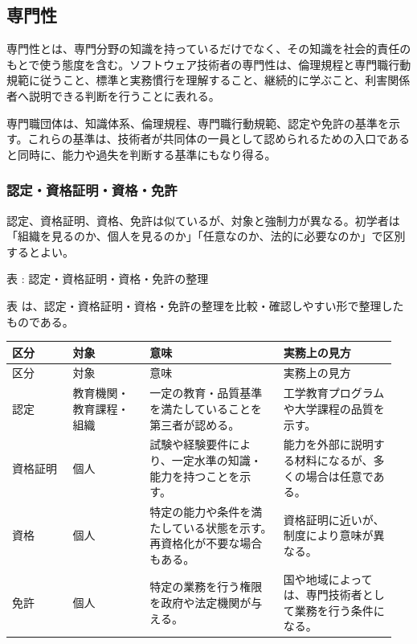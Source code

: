 \subsection*{専門性}


専門性とは、専門分野の知識を持っているだけでなく、その知識を社会的責任のもとで使う態度を含む。ソフトウェア技術者の専門性は、倫理規程と専門職行動規範に従うこと、標準と実務慣行を理解すること、継続的に学ぶこと、利害関係者へ説明できる判断を行うことに表れる。

専門職団体は、知識体系、倫理規程、専門職行動規範、認定や免許の基準を示す。これらの基準は、技術者が共同体の一員として認められるための入口であると同時に、能力や過失を判断する基準にもなり得る。

\subsubsection*{認定・資格証明・資格・免許}


認定、資格証明、資格、免許は似ているが、対象と強制力が異なる。初学者は「組織を見るのか、個人を見るのか」「任意なのか、法的に必要なのか」で区別するとよい。

\begin{center}
\small
\par\smallskip\noindent{}\label{tab:ch14-03}表 \thetable: 認定・資格証明・資格・免許の整理\par\smallskip
表 \thetable は、認定・資格証明・資格・免許の整理を比較・確認しやすい形で整理したものである。\par\smallskip
\begin{longtable}{p{0.15\linewidth}p{0.19\linewidth}p{0.33\linewidth}p{0.28\linewidth}}
\toprule
区分 & 対象 & 意味 & 実務上の見方 \\
\midrule
\endfirsthead
\toprule
区分 & 対象 & 意味 & 実務上の見方 \\
\midrule
\endhead
認定 & 教育機関・教育課程・組織 & 一定の教育・品質基準を満たしていることを第三者が認める。 & 工学教育プログラムや大学課程の品質を示す。 \\
\midrule
資格証明 & 個人 & 試験や経験要件により、一定水準の知識・能力を持つことを示す。 & 能力を外部に説明する材料になるが、多くの場合は任意である。 \\
\midrule
資格 & 個人 & 特定の能力や条件を満たしている状態を示す。再資格化が不要な場合もある。 & 資格証明に近いが、制度により意味が異なる。 \\
\midrule
免許 & 個人 & 特定の業務を行う権限を政府や法定機関が与える。 & 国や地域によっては、専門技術者として業務を行う条件になる。 \\
\midrule
\bottomrule
\end{longtable}
\normalsize
\end{center}


